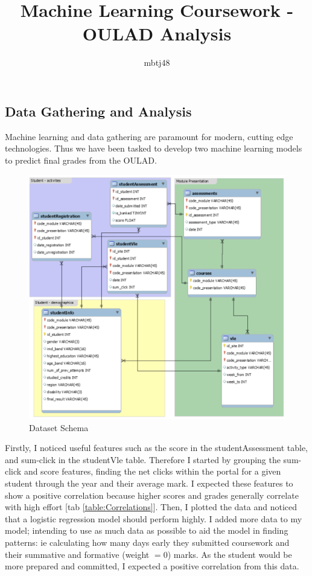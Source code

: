 \documentclass[11pt, a4paper]{article}
\title{\vspace{-1.25cm}Machine Learning Coursework - OULAD Analysis}
\author{mbtj48}
\date{}
\begin{document}
\maketitle
\vspace{-0.4cm}
\begin{multicols}{2}
\section{Data Gathering and Analysis}

Machine learning and data gathering are paramount for modern, cutting edge technologies. Thus we have been tasked to develop two machine learning models to predict final grades from the OULAD.

\begin{figure}[H]
	\includegraphics[width=\linewidth]{dataset.png} 
	\caption{Dataset Schema}
	\label{fig:schema}
\end{figure}
\vspace{-0.4cm}
Firstly, I noticed useful features such as the score in the studentAssessment table, and sum-click in the studentVle table.
Therefore I started by grouping the sum-click and score features, finding the net clicks within the portal for a given student through the year and their average mark. 
I expected these features to show a positive correlation because higher scores and grades generally correlate with high effort [tab \ref{table:Correlations}].
Then, I plotted the data and noticed that a logistic regression model should perform highly. 
I added more data to my model; intending to use as much data as possible to aid the model in finding patterns: ie calculating how many days early they submitted coursework and their summative and formative (weight $= 0$) marks. 
As the student would be more prepared and committed, I expected a positive correlation from this data.


\end{multicols}
\end{document}
